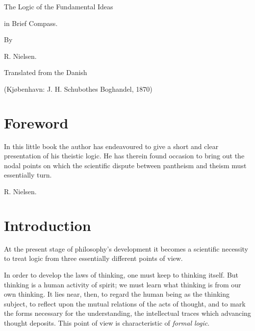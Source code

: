 \documentclass[12pt]{book}
\begin{document}
\begin{titlepage}
\centering
{\Huge The Logic of the Fundamental Ideas\par}
\vspace{1ex}
{\Large in Brief Compass.\par}
\vspace{4ex}
{\large By\par}
\vspace{2ex}
{\LARGE R. Nielsen.\par}
\vspace{4ex}
{\large Translated from the Danish\par}
{\large (Kjøbenhavn: J. H. Schubothes Boghandel, 1870)\par}
\end{titlepage}

\frontmatter

\chapter*{Foreword}
In this little book the author has endeavoured to give a short and
clear presentation of his theistic logic. He has therein found
occasion to bring out the nodal points on which the scientific
dispute between pantheism and theism must essentially turn.

\begin{flushright}R. Nielsen.\end{flushright}


\chapter*{Introduction}

At the present stage of philosophy's development it becomes a
scientific necessity to treat logic from three essentially different
points of view.

In order to develop the laws of thinking, one must keep to thinking
itself. But thinking is a human activity of spirit; we must learn
what thinking is from our own thinking. It lies near, then, to regard
the human being as the thinking subject, to reflect upon the mutual
relations of the acts of thought, and to mark the forms necessary for
the understanding, the intellectual traces which advancing thought
deposits. This point of view is characteristic of \emph{formal
logic}.
\end{document}
